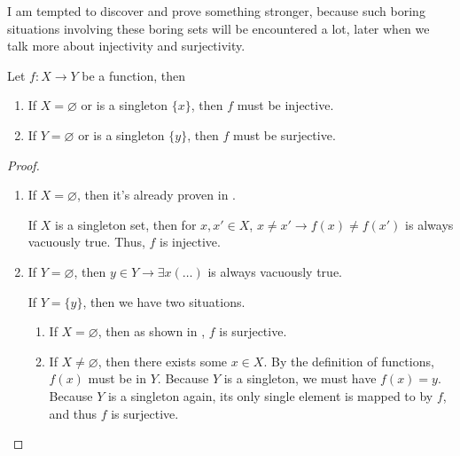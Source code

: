 I am tempted to discover and prove something stronger, because such boring situations involving these boring sets will be encountered a lot, later when we talk more about injectivity and surjectivity.
\begin{thm}\label{my.boring.inj.surj.thm}
	Let $f: X \to Y$ be a function, then
	\begin{enumerate}
		\item If $X = \varnothing$ or is a singleton $\{x\}$, then $f$ must be injective.
		\item If $Y = \varnothing$ or is a singleton $\{y\}$, then $f$ must be surjective.
	\end{enumerate}
\end{thm}
\begin{proof}\leavevmode
	\begin{enumerate}
		\item If $X = \varnothing$, then it's already proven in .
		
		If $X$ is a singleton set, then for $x,x' \in X$, $x \ne x' \to f(x) \ne f(x')$ is always vacuously true. Thus, $f$ is injective.
		
		\item If $Y = \varnothing$, then $y \in Y \to \exists x(\dots)$ is always vacuously true.
		
		If $Y = \{y\}$, then we have two situations.
		\begin{enumerate}
			\item If $X = \varnothing$, then as shown in , $f$ is surjective.
			\item If $X \ne \varnothing$, then there exists some $x \in X$. By the definition of functions, $f(x)$ must be in $Y$. Because $Y$ is a singleton, we must have $f(x) = y$. Because $Y$ is a singleton again, its only single element is mapped to by $f$, and thus $f$ is surjective.
		\end{enumerate}
	\end{enumerate}
\end{proof}

